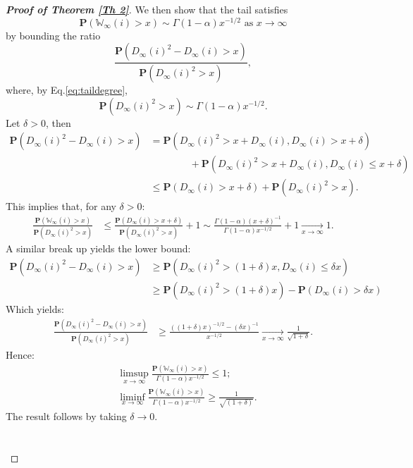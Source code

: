 \documentclass[11pt, reqno]{amsart}
\numberwithin{equation}{section}
\theoremstyle{plain} %
\theoremstyle{definition} %
\newcommand{\prob}{\mathbf{P}}
\begin{document}
\begin{proof}[{\bf Proof of Theorem \ref{Th 2}}]
We then show that the tail satisfies $$\prob(\mathbb{W}_\infty(i) > x)\sim \Gamma(1-\alpha)  x^{-1/2} \text{ as $x\to\infty$}$$
by  bounding the ratio $$\frac{\prob(D_{\infty}(i)^2 -D_{\infty}(i) > x)}{\prob(D_{\infty}(i)^2 > x)},$$
where, by Eq.\eqref{eq:taildegree},
\begin{equation}
    \prob(D_{\infty}(i)^2 > x)  \sim \Gamma(1-\alpha) x^{-1/2}.
\end{equation}
Let $\delta>0$, then 
\begin{align}
    \prob(D_{\infty}(i)^2 - D_\infty(i) > x) &= \prob(D_\infty(i)^2> x+ D_\infty(i), D_\infty(i) > x + \delta) \nonumber\\
    &\qquad \qquad +  \prob(D_{\infty}(i)^2> x + D_{\infty}(i), D_{\infty}(i) \leq x + \delta) \nonumber\\
    & \leq \prob( D_{\infty}(i) > x+\delta) +  \prob(D_{\infty}(i)^2> x).\label{eq: ub for W}
    \end{align}
This implies that, for any $\delta>0$:
\begin{align*}
 \frac{\prob( \mathbb{W}_\infty (i)>x)}{\prob(D_{\infty}(i)^2>x)} &\leq  \frac{ \prob(D_{\infty}(i) > x +  \delta)}{ \prob(D_{\infty}(i)^2 > x)} + 1 \sim \frac{\Gamma(1-\alpha)(x + \delta)^{-1}}{\Gamma(1-\alpha)x^{-1/2}} + 1   \xrightarrow[x \to \infty]{} 1.
\end{align*}
A similar break up yields the  lower bound:
\begin{align}
    \prob(D_{\infty}(i)^2 - D_{\infty}(i) > x) &\geq \prob(D_{\infty}(i)^2 > (1+\delta) x , D_{\infty}(i) \leq \delta x) \nonumber\\
      & \geq \prob(D_{\infty}(i)^2 > (1+\delta)x ) - \prob(D_{\infty}(i) > \delta x)\label{eq: lb for W}
\end{align}
Which yields:
\begin{equation*}
\begin{split}
    \frac{\prob(D_{\infty}(i)^2 -D_{\infty}(i) > x)}{\prob(D_{\infty}(i)^2 > x)} &\geq \frac{\left((1+\delta)x \right)^{-1/2}-  (\delta x)^{-1}}{ x^{-1/2}}  \xrightarrow[x\to\infty]{} \frac{1}{\sqrt{1+\delta}}.
    \end{split}
\end{equation*}
Hence:
\begin{align*}
   &\limsup_{x\to \infty}\frac{\prob( \mathbb{W}_\infty (i)>x)}{\Gamma(1-\alpha) x^{-1/2}} \le 1; \\
   &\liminf_{x\to \infty} \frac{\prob( \mathbb{W}_\infty (i)>x)}{\Gamma(1-\alpha) x^{-1/2}}\ge \frac{1}{\sqrt{(1+\delta)}}.
\end{align*}
The result follows by taking $\delta\to 0$.\\ \\ \\




\end{proof}
\end{document}
